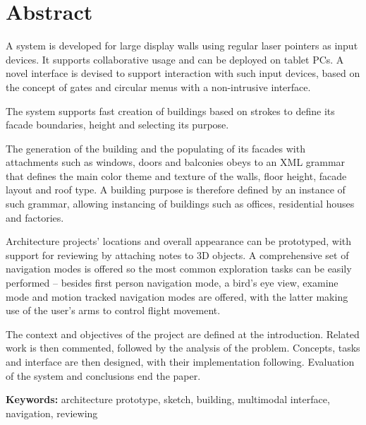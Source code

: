 \chapter*{Abstract}


A system is developed for large display walls using regular laser pointers
as input devices. It supports collaborative usage and can be deployed
on tablet PCs. A novel interface is devised to support interaction with such
input devices, based on the concept of gates and circular menus
with a non-intrusive interface.

The system supports fast creation of buildings based on strokes to define
its facade boundaries, height and selecting its purpose.

The generation of the building and the populating of its facades with
attachments such as windows, doors and balconies obeys to an XML
grammar that defines the main color theme and texture of the walls,
floor height, facade layout and roof type.
A building purpose is therefore defined by an instance of such grammar,
allowing instancing of buildings such as offices, residential houses and factories.

Architecture projects' locations and overall appearance can be prototyped,
with support for reviewing by attaching notes to 3D objects.
A comprehensive set of navigation modes is offered so
the most common exploration tasks can be easily performed
-- besides first person navigation mode, a bird's eye view,
examine mode and motion tracked navigation modes are offered, with the
latter making use of the user's arms to control flight movement.

The context and objectives of the project are defined at the introduction.
Related work is then commented, followed by the analysis of the problem.
Concepts, tasks and interface are then designed, with their implementation following.
Evaluation of the system and conclusions end the paper.

\textbf{Keywords:} architecture prototype, sketch, building, multimodal interface, navigation, reviewing
